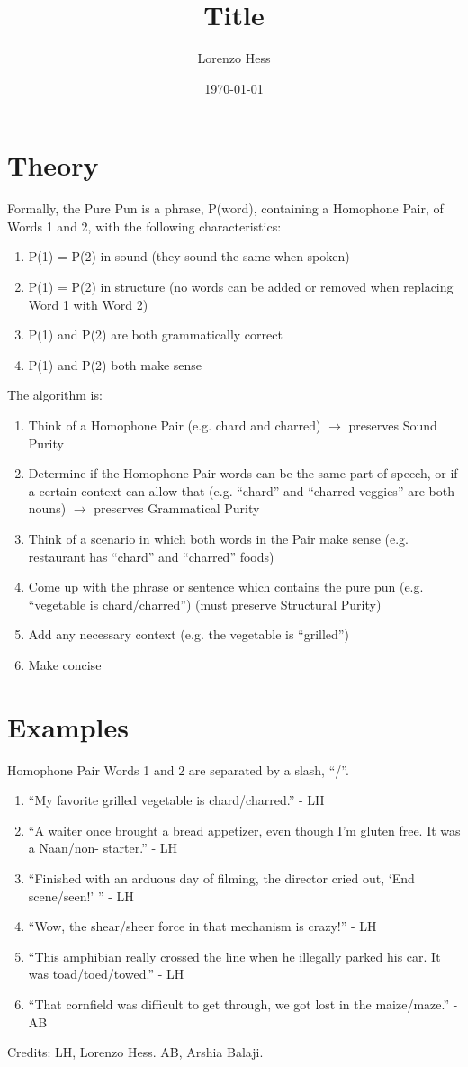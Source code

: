 \documentclass[12pt]{article}
\author{Lorenzo Hess}
\date{\today}
\title{Title}
\begin{document}
\section{Theory}%

Formally, the Pure Pun is a phrase, P(word), containing a Homophone Pair, of Words 1 and 2, with the following characteristics:
\begin{enumerate}
  \item P(1) = P(2) in sound (they sound the same when spoken)
  \item P(1) = P(2) in structure (no words can be added or removed when replacing Word 1 with Word 2)
  \item P(1) and P(2) are both grammatically correct
  \item P(1) and P(2) both make sense\\
\end{enumerate}

\noindent The algorithm is:
\begin{enumerate}
  \item Think of a Homophone Pair (e.g. chard and charred) $\to$ preserves Sound Purity
  \item Determine if the Homophone Pair words can be the same part of speech, or if a certain context can allow that (e.g. ``chard'' and ``charred veggies'' are both nouns) $\to$ preserves Grammatical Purity
  \item Think of a scenario in which both words in the Pair make sense (e.g. restaurant has ``chard'' and ``charred'' foods)
  \item Come up with the phrase or sentence which contains the pure pun (e.g. ``vegetable is chard/charred'') (must preserve Structural Purity)
  \item Add any necessary context (e.g. the vegetable is ``grilled'')
  \item Make concise
\end{enumerate}

\section{Examples}%

Homophone Pair Words 1 and 2 are separated by a slash, ``/''.

\begin{enumerate}
  \item ``My favorite grilled vegetable is chard/charred.'' - LH
  \item ``A waiter once brought a bread appetizer, even though I'm gluten free. It was a Naan/non- starter.'' - LH
  \item ``Finished with an arduous day of filming, the director cried out, `End scene/seen!' '' - LH
  \item ``Wow, the shear/sheer force in that mechanism is crazy!'' - LH
  \item ``This amphibian really crossed the line when he illegally parked his car. It was toad/toed/towed.'' - LH
  \item ``That cornfield was difficult to get through, we got lost in the maize/maze.'' - AB
\end{enumerate}

\vfill
Credits: LH, Lorenzo Hess. AB, Arshia Balaji.
\end{document}
